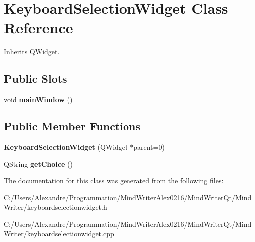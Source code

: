 \hypertarget{class_keyboard_selection_widget}{\section{Keyboard\-Selection\-Widget Class Reference}
\label{class_keyboard_selection_widget}
}


Inherits Q\-Widget.

\subsection*{Public Slots}
\begin{DoxyCompactItemize}
\item 
\hypertarget{class_keyboard_selection_widget_a3f192673a4541d7746e3c0835fd6e838}{void {\bfseries main\-Window} ()}\label{class_keyboard_selection_widget_a3f192673a4541d7746e3c0835fd6e838}

\end{DoxyCompactItemize}
\subsection*{Public Member Functions}
\begin{DoxyCompactItemize}
\item 
\hypertarget{class_keyboard_selection_widget_aa4e345252c736d328bf252d4dd6a4159}{{\bfseries Keyboard\-Selection\-Widget} (Q\-Widget $\ast$parent=0)}\label{class_keyboard_selection_widget_aa4e345252c736d328bf252d4dd6a4159}

\item 
\hypertarget{class_keyboard_selection_widget_a579133116ecb9a8cc48a22c445a6fc06}{Q\-String {\bfseries get\-Choice} ()}\label{class_keyboard_selection_widget_a579133116ecb9a8cc48a22c445a6fc06}

\end{DoxyCompactItemize}


The documentation for this class was generated from the following files\-:\begin{DoxyCompactItemize}
\item 
C\-:/\-Users/\-Alexandre/\-Programmation/\-Mind\-Writer\-Alex0216/\-Mind\-Writer\-Qt/\-Mind\-Writer/keyboardselectionwidget.\-h\item 
C\-:/\-Users/\-Alexandre/\-Programmation/\-Mind\-Writer\-Alex0216/\-Mind\-Writer\-Qt/\-Mind\-Writer/keyboardselectionwidget.\-cpp\end{DoxyCompactItemize}
